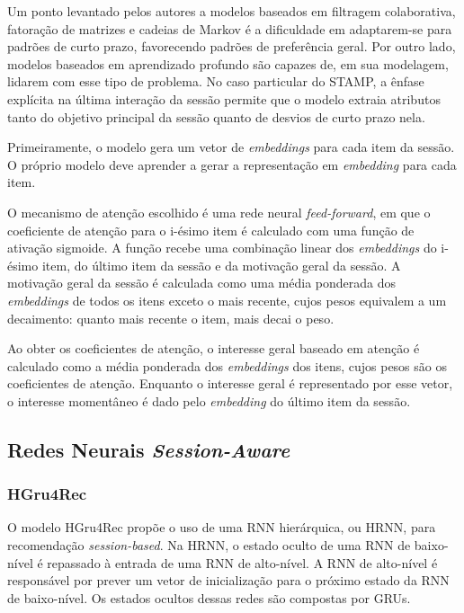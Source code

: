 Um ponto levantado pelos autores a modelos baseados em filtragem colaborativa,
fatoração de matrizes e cadeias de Markov é a dificuldade em adaptarem-se para
padrões de curto prazo, favorecendo padrões de preferência geral. Por outro
lado, modelos baseados em aprendizado profundo são capazes de, em sua modelagem,
lidarem com esse tipo de problema. No caso particular do STAMP, a ênfase
explícita na última interação da sessão permite que o modelo extraia atributos
tanto do objetivo principal da sessão quanto de desvios de curto prazo nela.

Primeiramente, o modelo gera um vetor de \textit{embeddings} para cada item da
sessão. O próprio modelo deve aprender a gerar a representação em
\textit{embedding} para cada item.

O mecanismo de atenção escolhido é uma rede neural \textit{feed-forward}, em que
o coeficiente de atenção para o i-ésimo item é calculado com uma função de
ativação sigmoide. A função recebe uma combinação linear dos \textit{embeddings} do
i-ésimo item, do último item da sessão e da motivação geral da sessão. A
motivação geral da sessão é calculada como uma média ponderada dos
\textit{embeddings} de todos os itens exceto o mais recente, cujos pesos
equivalem a um decaimento: quanto mais recente o item, mais decai o peso.

Ao obter os coeficientes de atenção, o interesse geral baseado em atenção é
calculado como a média ponderada dos \textit{embeddings} dos itens, cujos pesos
são os coeficientes de atenção. Enquanto o interesse geral é representado por
esse vetor, o interesse momentâneo é dado pelo \textit{embedding} do último item
da sessão. 

\subsection{Redes Neurais \textit{Session-Aware}}

\subsubsection{HGru4Rec}

O modelo HGru4Rec propõe o uso de uma RNN hierárquica, ou HRNN, para
recomendação \textit{session-based}. Na HRNN, o estado oculto de uma RNN de
baixo-nível é repassado à entrada de uma RNN de alto-nível. A RNN de alto-nível
é responsável por prever um vetor de inicialização para o próximo estado da RNN
de baixo-nível. Os estados ocultos dessas redes são compostas por GRUs.

